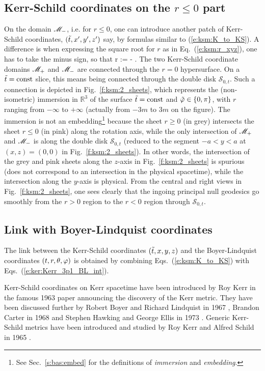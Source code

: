 \subsection{Kerr-Schild coordinates on the $r\leq 0$ part}

On the domain $\mathscr{M}_-$, i.e. for $r\leq 0$,
one can introduce another patch of Kerr-Schild coordinates, $({\tilde t},x',y',z')$ say,
by formulas similar to (\ref{e:ksm:K_to_KS}). A difference is when expressing
the square root for $r$ as in Eq.~(\ref{e:ksm:r_xyz}), one has to take the
minus sign, so that
\be
    r := -  .
\ee
The two Kerr-Schild coordinate domains $\mathscr{M}_+$ and $\mathscr{M}_-$ are connected through
the $r=0$ hypersurface. On a ${\tilde t}=\mathrm{const}$ slice, this means being
connected through the double disk $\mathcal{S}_{0,t}$. Such a connection
is depicted in Fig.~\ref{f:ksm:2_sheets}, which represents the (non-isometric)
immersion in $\mathbb{R}^3$ of the surface ${\tilde t}=\mathrm{const}$ and ${\tilde\varphi}\in\{0,\pi\}$,
with $r$ ranging from $-\infty$ to $+\infty$ (actually from $-3m$ to $3m$
on the figure). The immersion is not an embedding\footnote{See Sec.~\ref{s:bas:embed}
for the definitions of \emph{immersion} and \emph{embedding}.} because the
sheet $r\geq 0$ (in grey) intersects the sheet $r\leq 0$ (in pink) along the
rotation axis, while the only intersection of $\mathscr{M}_+$ and $\mathscr{M}_-$ is along
the double disk $\mathcal{S}_{0,t}$ (reduced to the segment $-a < y< a$ at
$(x,z) = (0,0)$ in Fig.~\ref{f:ksm:2_sheets}). In other words, the intersection
of the grey and pink sheets along the $z$-axis in Fig.~\ref{f:ksm:2_sheets}
is spurious (does not correspond to an intersection in the physical spacetime),
while the intersection along the $y$-axis is physical.
From the central and right views in Fig.~\ref{f:ksm:2_sheets}, one sees clearly
that the ingoing principal null geodesics go smoothly from the $r > 0$ region
to the $r < 0$ region through $\mathcal{S}_{0,t}$.


\subsection{Link with Boyer-Lindquist coordinates}

The link between the Kerr-Schild coordinates $({\tilde t},x,y,z)$ and the Boyer-Lindquist
coordinates $(t,r,\theta,\varphi)$
is obtained by combining Eqs.~(\ref{e:ksm:K_to_KS}) with Eqs.~(\ref{e:ker:Kerr_3p1_BL_int}).


\begin{hist}
Kerr-Schild coordinates on Kerr spacetime have been introduced by Roy Kerr in the famous 1963 paper
\cite{Kerr63} announcing the discovery of the
Kerr metric. They have been discussed further by Robert Boyer and Richard Lindquist
in 1967 \cite{BoyerL67}, Brandon Carter in 1968
\cite{Carte68}
and Stephen Hawking and George Ellis in 1973 \cite{HawkiE73}.
Generic Kerr-Schild metrics have been introduced and studied by Roy Kerr and Alfred
Schild
in 1965 \cite{KerrS65}.
\end{hist}
